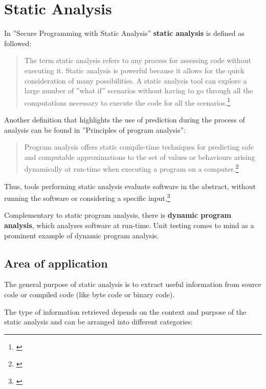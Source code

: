 \chapter{Static Analysis}
\label{chap:StaticAnalysis}

In ''Secure Programming with Static Analysis'' \textbf{static analysis} is defined as followed:

\begin{quotation}
The term static analysis refers to any process for assessing code without
executing it. Static analysis is powerful because it allows for the quick consideration of many possibilities. A static analysis tool can explore a large number of ''what if'' scenarios without having to go through all the computations
necessary to execute the code for all the scenarios.\footnote{\citep[3]{SecureProgramming}}
\end{quotation}

Another definition that highlights the use of prediction during the process of analysis can be found in ''Principles of program analysis'':

\begin{quotation}
Program analysis offers static compile-time techniques for predicting safe and computable approximations to the set of values or behaviours arising dynamically at run-time when executing a program on a computer.\footnote{\citep[1]{ProgramAnalysis}}
\end{quotation}

Thus, tools performing static analysis evaluate software in the abstract, without running the software or considering a specific input.\footnote{\citep[1]{UsingSAToFindBugs}}

Complementary to static program analysis, there is \textbf{dynamic program analysis}, which analyses software at run-time. Unit testing comes to mind as a prominent example of dynamic program analysis.

\newpage
\section{Area of application}
\label{sec:AreaOfApplication}

The general purpose of static analysis is to extract useful information from source code or compiled code (like byte code or binary code).

The type of information retrieved depends on the context and purpose of the static analysis and can be arranged into different categories:


